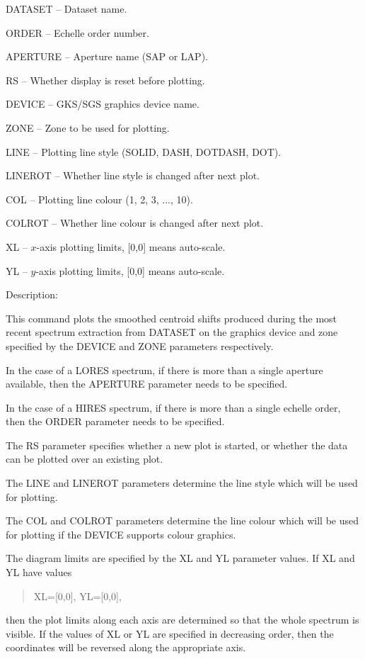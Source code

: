 \begin {description}
\begin {description}
\begin {description}
\item DATASET -- Dataset name.
\item ORDER -- Echelle order number.
\item APERTURE -- Aperture name (SAP or LAP).
\item RS -- Whether display is reset before plotting.
\item DEVICE -- GKS/SGS graphics device name.
\item ZONE -- Zone to be used for plotting.
\item LINE -- Plotting line style (SOLID, DASH, DOTDASH, DOT).
\item LINEROT -- Whether line style is changed after next plot.
\item COL -- Plotting line colour (1, 2, 3, ..., 10).
\item COLROT -- Whether line colour is changed after next plot.
\item XL -- $x$-axis plotting limits, [0,0] means auto-scale.
\item YL -- $y$-axis plotting limits, [0,0] means auto-scale.
\end {description}

\item Description:

This command plots the smoothed centroid shifts produced during
the most recent spectrum extraction from DATASET
on the graphics device and zone specified by the DEVICE and
ZONE parameters respectively.

In the case of a LORES spectrum, if there is more than a single
aperture available, then the APERTURE parameter needs to be specified.

In the case of a HIRES spectrum, if there is more than a single
echelle order, then the ORDER parameter needs to be specified.

The RS parameter specifies whether a new plot is started, or whether
the data can be plotted over an existing plot.

The LINE and LINEROT parameters determine the line style which will be
used for plotting.

The COL and COLROT parameters determine the line colour which will be used
for plotting if the DEVICE supports colour graphics.

The diagram limits are specified by the XL and YL parameter values.
If XL and YL have values

\begin {quote}
XL=[0,0], YL=[0,0],
\end {quote}
then the plot limits along each axis are determined so that the whole
spectrum is visible.
If the values of XL or YL are specified in decreasing order, then
the coordinates will be reversed along the appropriate axis.
\end {description}


\end{description}
